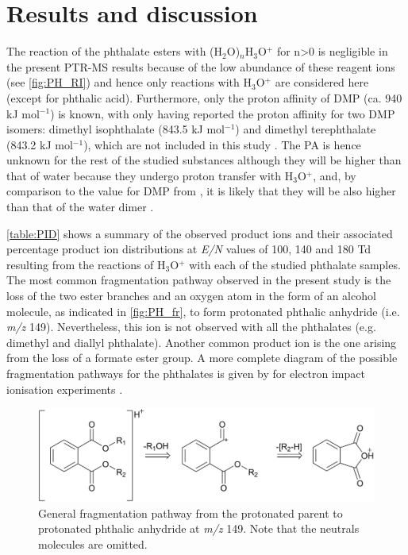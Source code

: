 




\section{Results and discussion}

The reaction of the phthalate esters with (H$_2$O)$_n$H$_3$O$^+$ for n>0 is negligible in the present PTR-MS results because of the low abundance of these reagent ions (see \autoref{fig:PH_RI}) and hence only reactions with H$_3$O$^+$ are considered here (except for phthalic acid).
%
Furthermore, only the proton affinity of DMP (ca. 940 kJ mol$^{-1}$) %
is known, with \citeauthor{doi:10.1063/1.556018}  only having reported the proton affinity for two DMP isomers: dimethyl isophthalate (843.5 kJ mol$^{-1}$) and dimethyl terephthalate (843.2 kJ mol$^{-1}$), which are not included in this study \cite{michalczuk2019isomer,doi:10.1063/1.556018}.
%
The PA is hence unknown for the rest of the studied substances although they will  be higher than that of water because they undergo proton transfer with H$_3$O$^+$, and, by comparison  to the value for DMP from \citeauthor{michalczuk2019isomer}, it is likely that they will be also higher than that of the water dimer \cite{michalczuk2019isomer}.


 
 \autoref{table:PID} shows a summary of the observed product ions and their associated percentage product ion distributions at \textit{E/N} values of 100, 140 and 180 Td resulting from the reactions of H$_3$O$^+$ with each of the studied phthalate samples. 
%
The most common fragmentation pathway observed in the present study is the loss of the two %
ester branches and an oxygen atom in the form of an alcohol molecule, as indicated in \autoref{fig:PH_fr}, to form protonated phthalic anhydride (i.e. \textit{m/z} 149).
%
Nevertheless, this ion is not observed with all the phthalates (e.g. dimethyl and diallyl phthalate). %
%
Another common product ion is the one arising from the loss of a formate ester group.
%
A more complete diagram of the possible fragmentation pathways for the phthalates is  given by \citeauthor{yin2014mass} for electron impact ionisation experiments \cite{yin2014mass}.
%
\begin{figure}[htb]%
\centering
\includegraphics[height=0.12\textheight]{pics/PH/frag.png}
\caption{General fragmentation pathway from the protonated parent to  protonated phthalic anhydride at \textit{m/z} 149. Note that the neutrals molecules are omitted.}
\label{fig:PH_fr}
\end{figure}

